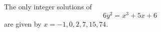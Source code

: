 \begin{conjecture}
    The only integer solutions of
\[
    6y^2=x^3+5x+6
\]
    are given by $x=-1,0,2,7,15,74$.
\end{conjecture}
